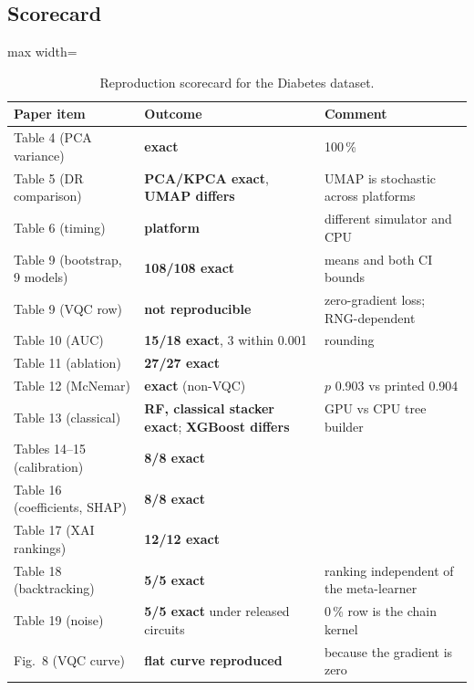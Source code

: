\documentclass[11pt,a4paper]{article}
\newcommand{\OK}[1]{\textcolor{ok}{\textbf{#1}}}
\newcommand{\WARN}[1]{\textcolor{warn}{\textbf{#1}}}
\newcommand{\BAD}[1]{\textcolor{bad}{\textbf{#1}}}
\begin{document}
\subsection{Scorecard}
\begin{table}[H]
\centering\footnotesize
\caption{Reproduction scorecard for the Diabetes dataset.}
\begin{adjustbox}{max width=\textwidth}
\begin{tabular}{llp{6.6cm}}
\toprule
Paper item & Outcome & Comment \\
\midrule
Table 4 (PCA variance) & \OK{exact} & 100\,\% \\
Table 5 (DR comparison) & \OK{PCA/KPCA exact}, \WARN{UMAP differs} & UMAP is stochastic across platforms \\
Table 6 (timing) & \WARN{platform} & different simulator and CPU \\
Table 9 (bootstrap, 9 models) & \OK{108/108 exact} & means and both CI bounds \\
Table 9 (VQC row) & \BAD{not reproducible} & zero-gradient loss; RNG-dependent \\
Table 10 (AUC) & \OK{15/18 exact}, 3 within 0.001 & rounding \\
Table 11 (ablation) & \OK{27/27 exact} & \\
Table 12 (McNemar) & \OK{exact} (non-VQC) & $p$ 0.903 vs printed 0.904 \\
Table 13 (classical) & \OK{RF, classical stacker exact}; \WARN{XGBoost differs} & GPU vs CPU tree builder \\
Tables 14--15 (calibration) & \OK{8/8 exact} & \\
Table 16 (coefficients, SHAP) & \OK{8/8 exact} & \\
Table 17 (XAI rankings) & \OK{12/12 exact} & \\
Table 18 (backtracking) & \OK{5/5 exact} & ranking independent of the meta-learner \\
Table 19 (noise) & \OK{5/5 exact} under released circuits & 0\,\% row is the chain kernel \\
Fig.~8 (VQC curve) & \OK{flat curve reproduced} & because the gradient is zero \\
\bottomrule
\end{tabular}
\end{adjustbox}
\end{table}

\end{document}
